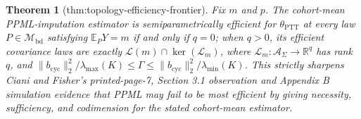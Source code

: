 \documentclass{article}
\newtheorem{theorem}{Theorem}
\begin{document}
\begin{theorem}[thm:topology-efficiency-frontier]\label{thm:topology-efficiency-frontier}
Fix \(m\) and \(p\). The cohort-mean PPML-imputation estimator is semiparametrically efficient for \(\theta_{\mathrm{PTT}}\) at every law \(P\in\mathcal M_{\mathrm{bd}}\) satisfying \(\mathbb E_PY=m\) if and only if \(q=0\); when \(q>0\), its efficient covariance laws are exactly \(\mathcal L(m)\cap\ker(\mathcal L_m)\), where \(\mathcal L_m:\mathcal A_{\Sigma}\to\mathbb R^q\) has rank \(q\), and \(\|b_{\mathrm{cyc}}\|_2^2/\lambda_{\max}(K)\le\Gamma\le\|b_{\mathrm{cyc}}\|_2^2/\lambda_{\min}(K)\). This strictly sharpens Ciani and Fisher's printed-page-7, Section 3.1 observation and Appendix B simulation evidence that PPML may fail to be most efficient by giving necessity, sufficiency, and codimension for the stated cohort-mean estimator.
\end{theorem}
\end{document}
